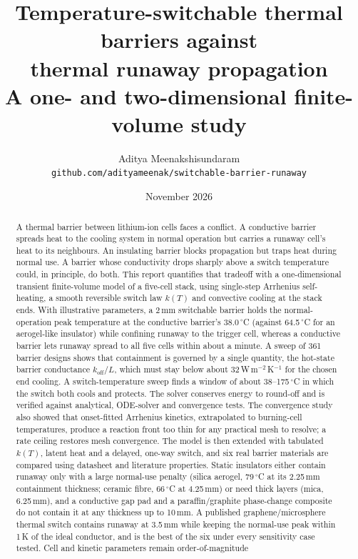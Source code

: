 \documentclass[11pt]{article}
\title{Temperature-switchable thermal barriers against\\ thermal runaway propagation\\[6pt]
\large A one- and two-dimensional finite-volume study}
\author{Aditya Meenakshisundaram\\[4pt]
\small\texttt{github.com/adityameenak/switchable-barrier-runaway}}
\date{November 2026}
\newcommand{\koff}{k_\mathrm{off}}
\begin{document}
\maketitle

\begin{abstract}
\noindent A thermal barrier between lithium-ion cells faces a conflict. A conductive
barrier spreads heat to the cooling system in normal operation but carries a runaway
cell's heat to its neighbours. An insulating barrier blocks propagation but traps heat
during normal use. A barrier whose conductivity drops sharply above a switch
temperature could, in principle, do both. This report quantifies that tradeoff with a
one-dimensional transient finite-volume model of a five-cell stack, using single-step
Arrhenius self-heating, a smooth reversible switch law $k(T)$ and convective cooling at
the stack ends. With illustrative parameters, a 2\,mm switchable barrier holds the
normal-operation peak temperature at the conductive barrier's 38.0\,$^\circ$C (against
64.5\,$^\circ$C for an aerogel-like insulator) while confining runaway to the trigger
cell, whereas a conductive barrier lets runaway spread to all five cells within about a
minute. A sweep of 361 barrier designs shows that containment is governed by a single
quantity, the hot-state barrier conductance $\koff/L$, which must stay below about
32\,W\,m$^{-2}$\,K$^{-1}$ for the chosen end cooling. A switch-temperature sweep finds a
window of about 38--175\,$^\circ$C in which the switch both cools and protects. The
solver conserves energy to round-off and is verified against analytical, ODE-solver and
convergence tests. The convergence study also showed that onset-fitted Arrhenius
kinetics, extrapolated to burning-cell temperatures, produce a reaction front too thin
for any practical mesh to resolve; a rate ceiling restores mesh convergence. The model
is then extended with tabulated $k(T)$, latent heat and a delayed, one-way switch, and six
real barrier materials are compared using datasheet and literature properties. Static
insulators either contain runaway only with a large normal-use penalty (silica aerogel,
79\,$^\circ$C at its 2.25\,mm containment thickness; ceramic fibre, 66\,$^\circ$C at
4.25\,mm) or need thick layers (mica, 6.25\,mm), and a conductive gap pad and a
paraffin/graphite phase-change composite do not contain it at any thickness up to
10\,mm. A published graphene/microsphere thermal switch contains runaway at 3.5\,mm while
keeping the normal-use peak within 1\,K of the ideal conductor, and is the best of the six
under every sensitivity case tested. Cell and kinetic parameters remain order-of-magnitude

\end{abstract}
\end{document}
